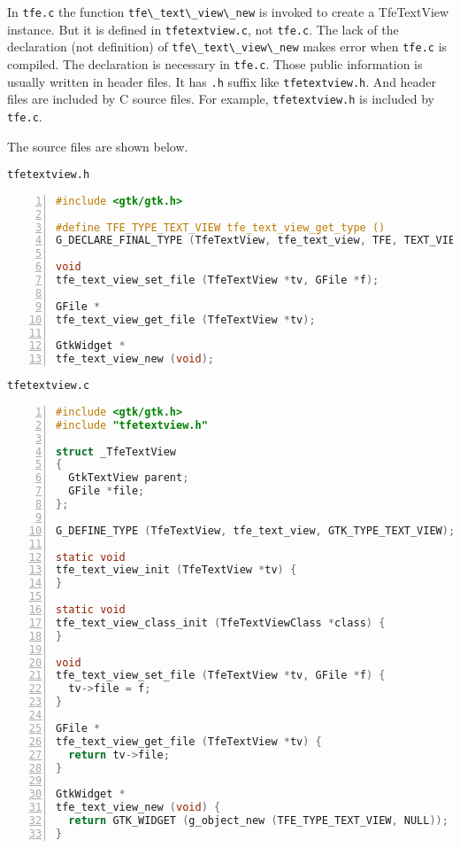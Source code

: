 In \passthrough{\lstinline!tfe.c!} the function
\passthrough{\lstinline!tfe\_text\_view\_new!} is invoked to create a
TfeTextView instance. But it is defined in
\passthrough{\lstinline!tfetextview.c!}, not
\passthrough{\lstinline!tfe.c!}. The lack of the declaration (not
definition) of \passthrough{\lstinline!tfe\_text\_view\_new!} makes
error when \passthrough{\lstinline!tfe.c!} is compiled. The declaration
is necessary in \passthrough{\lstinline!tfe.c!}. Those public
information is usually written in header files. It has
\passthrough{\lstinline!.h!} suffix like
\passthrough{\lstinline!tfetextview.h!}. And header files are included
by C source files. For example, \passthrough{\lstinline!tfetextview.h!}
is included by \passthrough{\lstinline!tfe.c!}.

The source files are shown below.

\passthrough{\lstinline!tfetextview.h!}

\begin{lstlisting}[language=C, numbers=left]
#include <gtk/gtk.h>

#define TFE_TYPE_TEXT_VIEW tfe_text_view_get_type ()
G_DECLARE_FINAL_TYPE (TfeTextView, tfe_text_view, TFE, TEXT_VIEW, GtkTextView)

void
tfe_text_view_set_file (TfeTextView *tv, GFile *f);

GFile *
tfe_text_view_get_file (TfeTextView *tv);

GtkWidget *
tfe_text_view_new (void);
\end{lstlisting}

\passthrough{\lstinline!tfetextview.c!}

\begin{lstlisting}[language=C, numbers=left]
#include <gtk/gtk.h>
#include "tfetextview.h"

struct _TfeTextView
{
  GtkTextView parent;
  GFile *file;
};

G_DEFINE_TYPE (TfeTextView, tfe_text_view, GTK_TYPE_TEXT_VIEW);

static void
tfe_text_view_init (TfeTextView *tv) {
}

static void
tfe_text_view_class_init (TfeTextViewClass *class) {
}

void
tfe_text_view_set_file (TfeTextView *tv, GFile *f) {
  tv->file = f;
}

GFile *
tfe_text_view_get_file (TfeTextView *tv) {
  return tv->file;
}

GtkWidget *
tfe_text_view_new (void) {
  return GTK_WIDGET (g_object_new (TFE_TYPE_TEXT_VIEW, NULL));
}
\end{lstlisting}

